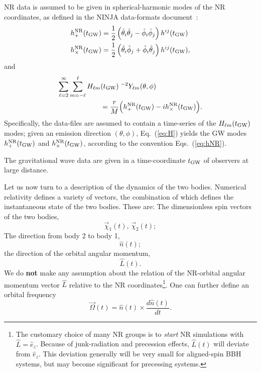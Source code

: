 \documentclass[aps,prd,amssymb,amsmath,amsfonts,superscriptaddress,
floatfix ,preprintnumbers,altaffilletter]{revtex4}
\newcommand{\EzNR}{\hat e_z}
\newcommand{\tNR}{\theta}
\newcommand{\pNR}{\phi}
\newcommand{\EtNR}{{\hat\theta}}
\newcommand{\EpNR}{{\hat\phi}}
\newcommand{\hpNR}{h_+^{\rm NR}}
\newcommand{\hcNR}{h_{\times}^{\rm NR}}
\newcommand{\nNR}{\hat{n}}
\newcommand{\lNR}{\hat L}
\newcommand{\tGW}{t_{\rm GW}}
\begin{document}
NR data is assumed to be given in spherical-harmonic modes of the
NR coordinates, as defined in the NINJA data-formats
document~\cite{Brown:2007jx}:
\begin{subequations}\label{eq:hNR}
\begin{align}
  \hpNR(\tGW) & = \frac{1}{2}\left(\EtNR_i\EtNR_j-\EpNR_i\EpNR_j\right)h^{ij}(\tGW)\\
  \hcNR(\tGW) & = \frac{1}{2}\left(\EtNR_i\EpNR_j+\EpNR_i\EtNR_j\right)h^{ij}(\tGW),
\end{align}
\end{subequations}
and
\begin{align}\label{eq:H}
  \sum_{\ell=2}^\infty\sum_{m=-\ell}^\ell H_{\ell m}&(\tGW)\;^{-2}Y_{\ell m}(\tNR,\pNR)\\
  &= \frac{r}{M}\Big(\hpNR(\tGW)-i\hcNR(\tGW)\Big).\nonumber
\end{align}
Specifically, the data-files are assumed to contain a time-series of
the $H_{\ell m}(\tGW)$ modes; given an emission direction $(\tNR,\pNR)$,
Eq.~(\ref{eq:H}) yields the GW modes $\hpNR(\tGW)$ and $\hcNR(\tGW)$, according to
the convention Eqs.~(\ref{eq:hNR}).

The gravitational wave data are given in a time-coordinate $\tGW$ of
observers at large distance.

Let us now turn to a description of the dynamics of the two bodies.
Numerical relativity defines a variety of vectors, the combination of
which defines the instantaneous state of the two bodies.  These are:
The dimensionless spin vectors of the two bodies,
\begin{equation}\label{eq:chi}
  \vec\chi_1(t),\, \vec\chi_2(t);
\end{equation}
The direction from body 2 to body 1,
\begin{equation}
  \nNR(t);
\end{equation}
the direction of the orbital angular momentum,
\begin{equation}
  \hat L(t).
\end{equation}
We do {\bf not} make any assumption about the relation of the
NR-orbital angular momentum vector $\lNR$ relative to the NR
coordinates\footnote{The customary choice of many NR groups is to
  \emph{start} NR simulations with $\lNR=\EzNR$.  Because of
  junk-radiation and precession effects, $\lNR(t)$ will deviate from
  $\EzNR$.  This deviation generally will be very small for
  aligned-spin BBH systems, but may become significant for precessing
  systems.}.
One can further define an orbital frequency
\begin{equation}\label{eq:Omega}
  \vec\Omega(t) = \nNR(t) \times \frac{d\nNR(t)}{dt}.
\end{equation}
\end{document}
